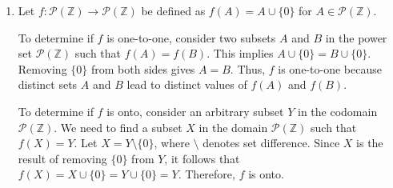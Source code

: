 \documentclass{article}
\newcommand{\Z}{\mathbb{Z}}
\theoremstyle{definition}
\begin{document}
\begin{solution}
\begin{enumerate}
    \item Let $f : \mathcal{P}(\Z) \to \mathcal{P}(\Z)$ be defined as $f(A) = A \cup \{ 0 \}$ for $A \in \mathcal{P}(\Z)$.

    To determine if $f$ is one-to-one, consider two subsets $A$ and $B$ in the power set $\mathcal{P}(\Z)$ such that $f(A) = f(B)$. This implies $A \cup \{ 0 \} = B \cup \{ 0 \}$. Removing $\{ 0 \}$ from both sides gives $A = B$. Thus, $f$ is one-to-one because distinct sets $A$ and $B$ lead to distinct values of $f(A)$ and $f(B)$.

    To determine if $f$ is onto, consider an arbitrary subset $Y$ in the codomain $\mathcal{P}(\Z)$. We need to find a subset $X$ in the domain $\mathcal{P}(\Z)$ such that $f(X) = Y$. Let $X = Y \setminus \{ 0 \}$, where $\setminus$ denotes set difference. Since $X$ is the result of removing $\{ 0 \}$ from $Y$, it follows that $f(X) = X \cup \{ 0 \} = Y \cup \{ 0 \} = Y$. Therefore, $f$ is onto.

\end{enumerate}
\end{solution}
\end{document}
